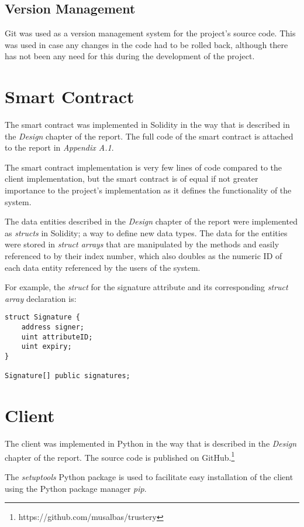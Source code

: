 \documentclass[12pt]{report}
\begin{document}
	\subsection{Version Management}
	Git was used as a version management system for the project's source code. This was used in case any changes in the code had to be rolled back, although there has not been any need for this during the development of the project.
	
	\section{Smart Contract}
	The smart contract was implemented in Solidity in the way that is described in the \textit{Design} chapter of the report. The full code of the smart contract is attached to the report in \textit{Appendix A.1}.
	
	The smart contract implementation is very few lines of code compared to the client implementation, but the smart contract is of equal if not greater importance to the project's implementation as it defines the functionality of the system.
	
	The data entities described in the \textit{Design} chapter of the report were implemented as \textit{structs} in Solidity; a way to define new data types.\cite{13} The data for the entities were stored in \textit{struct arrays} that are manipulated by the methods and easily referenced to by their index number, which also doubles as the numeric ID of each data entity referenced by the users of the system.
	
	For example, the \textit{struct} for the signature attribute and its corresponding \textit{struct array} declaration is:
	\begin{lstlisting}
struct Signature {
    address signer;
    uint attributeID;
    uint expiry;
}

Signature[] public signatures;
	\end{lstlisting}
	
	\section{Client}
	The client was implemented in Python in the way that is described in the \textit{Design} chapter of the report. The source code is published on GitHub.\footnote{https://github.com/musalbas/trustery}
	
	The \textit{setuptools} Python package is used to facilitate easy installation of the client using the Python package manager \textit{pip}.
	
\end{document}
